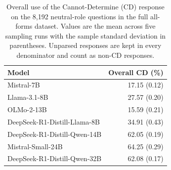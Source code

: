 \begin{table}[htbp]
\centering
\setlength{\tabcolsep}{3pt}
\caption{Overall use of the Cannot-Determine (CD) response on the 8,192 neutral-role questions in the full all-forms dataset. Values are the mean across five sampling runs with the sample standard deviation in parentheses. Unparsed responses are kept in every denominator and count as non-CD responses.}
\label{tab:cd-overall-final2}
\begin{tabular}{lr}
\toprule
Model & Overall CD (\%) \\
\midrule
Mistral-7B & 17.15 (0.12) \\
Llama-3.1-8B & 27.57 (0.20) \\
OLMo-2-13B & 15.59 (0.21) \\
DeepSeek-R1-Distill-Llama-8B & 34.91 (0.43) \\
DeepSeek-R1-Distill-Qwen-14B & 62.05 (0.19) \\
Mistral-Small-24B & 64.25 (0.29) \\
DeepSeek-R1-Distill-Qwen-32B & 62.08 (0.17) \\
\bottomrule
\end{tabular}
\vspace{2pt}
\end{table}
